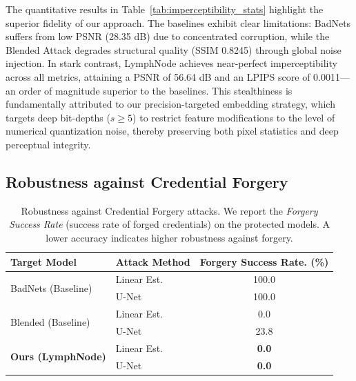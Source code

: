 \documentclass[conference]{IEEEtran}
\begin{document}
The quantitative results in Table~\ref{tab:imperceptibility_stats} highlight the superior fidelity of our approach. The baselines exhibit clear limitations: BadNets suffers from low PSNR (28.35 dB) due to concentrated corruption, while the Blended Attack degrades structural quality (SSIM 0.8245) through global noise injection. In stark contrast, LymphNode achieves near-perfect imperceptibility across all metrics, attaining a PSNR of 56.64 dB and an LPIPS score of 0.0011—an order of magnitude superior to the baselines. This stealthiness is fundamentally attributed to our precision-targeted embedding strategy, which targets deep bit-depths ($s \ge 5$) to restrict feature modifications to the level of numerical quantization noise, thereby preserving both pixel statistics and deep perceptual integrity.

\subsection{Robustness against Credential Forgery}

\begin{table}[ht]
    \centering
    \caption{Robustness against Credential Forgery attacks. We report the \textit{Forgery Success Rate} (success rate of forged credentials) on the protected models. A lower accuracy indicates higher robustness against forgery.}
    \label{tab:forgery_results}
    \renewcommand{\arraystretch}{1.2} 
    \begin{tabular}{llc}
        \toprule
        \textbf{Target Model} & \textbf{Attack Method} & \textbf{Forgery Success Rate. (\%)} \\
        \midrule
        \multirow{2}{*}{BadNets (Baseline)} & Linear Est. & 100.0 \\
                                            & U-Net       & 100.0 \\
        \midrule
        \multirow{2}{*}{Blended (Baseline)} & Linear Est. & 0.0 \\
                                            & U-Net       & 23.8 \\
        \midrule
        \multirow{2}{*}{\textbf{Ours (LymphNode)}} & Linear Est. & \textbf{0.0} \\
                                                   & U-Net       & \textbf{0.0} \\
        \bottomrule
    \end{tabular}
\end{table}
\end{document}
